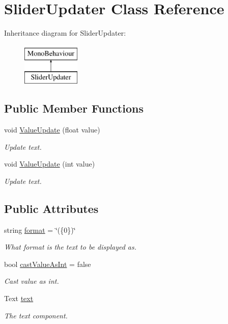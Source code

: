 \hypertarget{class_slider_updater}{}\section{Slider\+Updater Class Reference}
\label{class_slider_updater}
Inheritance diagram for Slider\+Updater\+:\begin{figure}[H]
\begin{center}
\leavevmode
\includegraphics[height=2.000000cm]{class_slider_updater}
\end{center}
\end{figure}
\subsection*{Public Member Functions}
\begin{DoxyCompactItemize}
\item 
void \hyperlink{class_slider_updater_a33264abb23d46891dae8dc3855f51a9c}{Value\+Update} (float value)
\begin{DoxyCompactList}\small\item\em Update text. \end{DoxyCompactList}\item 
void \hyperlink{class_slider_updater_a8c7e5769f8782fd3b68d23d79b183788}{Value\+Update} (int value)
\begin{DoxyCompactList}\small\item\em Update text. \end{DoxyCompactList}\end{DoxyCompactItemize}
\subsection*{Public Attributes}
\begin{DoxyCompactItemize}
\item 
string \hyperlink{class_slider_updater_a5ddaafcb18ae7f53f7e46cc1a5c48e6b}{format} = \char`\"{}(\{0\})\char`\"{}
\begin{DoxyCompactList}\small\item\em What format is the text to be displayed as. \end{DoxyCompactList}\item 
bool \hyperlink{class_slider_updater_a8b99b814d4e1bdd762695f370a0f9670}{cast\+Value\+As\+Int} = false
\begin{DoxyCompactList}\small\item\em Cast value as int. \end{DoxyCompactList}\item 
Text \hyperlink{class_slider_updater_a898a16c05ade8c926f2a74553d0f85ce}{text}
\begin{DoxyCompactList}\small\item\em The text component. \end{DoxyCompactList}\end{DoxyCompactItemize}


